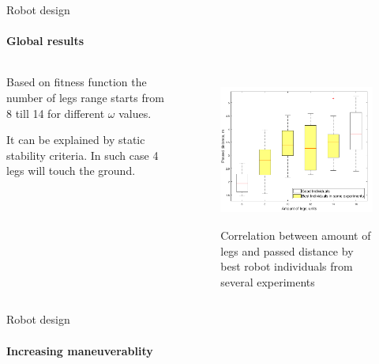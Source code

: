 \documentclass[aspectratio=169,xcolor=table]{beamer}
\begin{document}
\begin{frame}[t]{Robot design}
    \framesubtitle{Global results}
    \begin{columns}[T,onlytextwidth]
        \begin{column}{0.49\textwidth}
            Based on fitness function the number of legs range starts from 8 till 14 for different $\omega$ values. 
            
            It can be explained by static stability criteria. In such case 4 legs will touch the ground.    
        \end{column}
        \begin{column}{0.49\textwidth}
            \vspace{-1.8cm}
            \begin{figure}[H]
                \centering\includegraphics[height=5cm,width=1\textwidth,keepaspectratio]{box_plot_structural_synthesis.png}
                \caption*{Correlation between amount of legs and passed distance by best robot individuals from several experiments}
                \label{fig:box_plot_structural_synthesis.png}
            \end{figure}
        \end{column}
    \end{columns}
\end{frame}

\begin{frame}[t]{Robot design}
    \framesubtitle{Increasing maneuverablity}
\end{frame}
\end{document}
